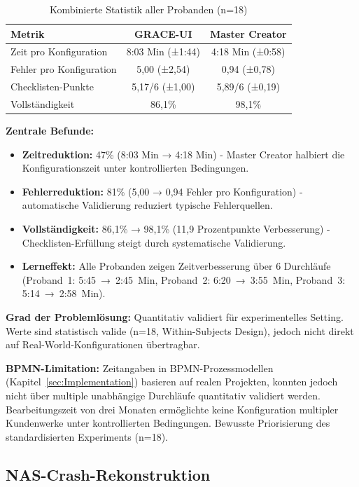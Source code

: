 \begin{table}[htbp]
\centering
\small
\begin{tabular}{|l|c|c|}
\hline
\textbf{Metrik} & \textbf{GRACE-UI} & \textbf{Master Creator} \\
\hline
Zeit pro Konfiguration & 8:03 Min (±1:44) & 4:18 Min (±0:58) \\
Fehler pro Konfiguration & 5,00 (±2,54) & 0,94 (±0,78) \\
Checklisten-Punkte & 5,17/6 (±1,00) & 5,89/6 (±0,19) \\
Vollständigkeit & 86,1\% & 98,1\% \\
\hline
\end{tabular}
\caption{Kombinierte Statistik aller Probanden (n=18)}
\label{tab:KombinierteStatistik}
\end{table}

\noindent \textbf{Zentrale Befunde:}

\begin{itemize}
    \item \textbf{Zeitreduktion:} 47\% (8:03 Min → 4:18 Min) - Master Creator halbiert die Konfigurationszeit unter kontrollierten Bedingungen.
    \item \textbf{Fehlerreduktion:} 81\% (5,00 → 0,94 Fehler pro Konfiguration) - automatische Validierung reduziert typische Fehlerquellen.
    \item \textbf{Vollständigkeit:} 86,1\% → 98,1\% (11,9 Prozentpunkte Verbesserung) - Checklisten-Erfüllung steigt durch systematische Validierung.
    \item \textbf{Lerneffekt:} Alle Probanden zeigen Zeitverbesserung über 6 Durchläufe (Proband~1: 5:45~→~2:45~Min, Proband~2: 6:20~→~3:55~Min, Proband~3: 5:14~→~2:58~Min).
\end{itemize}

\noindent \textbf{Grad der Problemlösung:} Quantitativ validiert für experimentelles Setting. Werte sind statistisch valide (n=18, Within-Subjects Design), jedoch nicht direkt auf Real-World-Konfigurationen übertragbar.

\noindent \textbf{BPMN-Limitation:} Zeitangaben in BPMN-Prozessmodellen (Kapitel~\ref{sec:Implementation}) basieren auf realen Projekten, konnten jedoch nicht über multiple unabhängige Durchläufe quantitativ validiert werden. Bearbeitungszeit von drei Monaten ermöglichte keine Konfiguration multipler Kundenwerke unter kontrollierten Bedingungen. Bewusste Priorisierung des standardisierten Experiments (n=18).


\subsection{NAS-Crash-Rekonstruktion}
\label{subsec:NASCrashValidierung}

